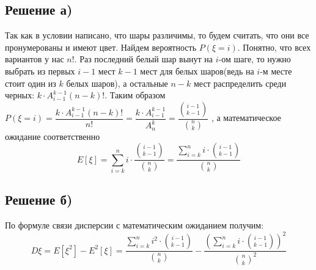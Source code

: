 \documentclass[a4paper, 12pt]{article}
\newcommand{\D}{\displaystyle}
\begin{document}
\begin{spacing}{1}
\subsection{Решение а)}
Так как в условии написано, что шары различимы, то будем считать, что они все пронумерованы и имеют цвет. Найдем вероятность $P(\xi = i)$. Понятно, что всех вариантов у нас $n!$. Раз последний белый шар вынут на $i$-ом шаге, то нужно выбрать из первых $i - 1$ мест $k - 1$ мест для белых шаров(ведь на $i$-м месте стоит один из $k$ белых шаров), а остальные $n - k$ мест распределить среди черных: $\D k\cdot A_{i-1}^{k-1} (n-k)!$. Таким образом $\D P(\xi = i) = \dfrac{k\cdot A_{i-1}^{k-1}(n-k)!}{n!}= \dfrac{k\cdot A_{i-1}^{k-1}}{A_n^k} = \dfrac{\binom{i-1}{k-1}}{\binom{n}{k}}$ , а математическое ожидание соответственно
$$
E[\xi] = \sum\limits_{i = k}^n i \cdot \dfrac{\binom{i-1}{k-1}}{\binom{n}{k}} = \dfrac{\sum\limits_{i = k}^n i \cdot \binom{i-1}{k-1}}{\binom{n}{k}}
$$
\subsection{Решение б)} По формуле связи дисперсии с математическим ожиданием получим:
$$
D\xi = E[\xi^2] - E^2[\xi] = \dfrac{\sum\limits_{i = k}^n i^2 \cdot \binom{i-1}{k-1}}{\binom{n}{k}} - \dfrac{(\sum\limits_{i = k}^n i \cdot \binom{i-1}{k-1})^2}{\binom{n}{k}^2} 
$$
\end{spacing}
\end{document}
